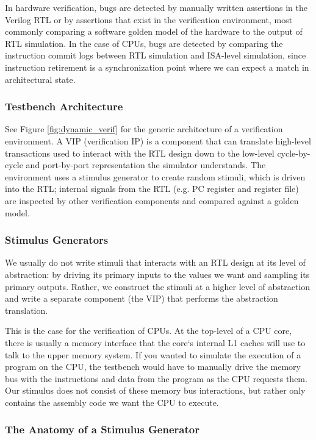\documentclass[sigconf,noacm]{acmart}
\begin{document}
In hardware verification, bugs are detected by manually written assertions in the Verilog RTL or by assertions that exist in the verification environment, most commonly comparing a software golden model of the hardware to the output of RTL simulation.
In the case of CPUs, bugs are detected by comparing the instruction commit logs between RTL simulation and ISA-level simulation, since instruction retirement is a synchronization point where we can expect a match in architectural state.

\subsubsection{Testbench Architecture}

See Figure \ref{fig:dynamic_verif} for the generic architecture of a verification environment.
A VIP (verification IP) is a component that can translate high-level transactions used to interact with the RTL design down to the low-level cycle-by-cycle and port-by-port representation the simulator understands.
The environment uses a stimulus generator to create random stimuli, which is driven into the RTL; internal signals from the RTL (e.g. PC register and register file) are inspected by other verification components and compared against a golden model.

\subsubsection{Stimulus Generators}

We usually do not write stimuli that interacts with an RTL design at its level of abstraction: by driving its primary inputs to the values we want and sampling its primary outputs.
Rather, we construct the stimuli at a higher level of abstraction and write a separate component (the VIP) that performs the abstraction translation.

This is the case for the verification of CPUs.
At the top-level of a CPU core, there is usually a memory interface that the core`s internal L1 caches will use to talk to the upper memory system.
If you wanted to simulate the execution of a program on the CPU, the testbench would have to manually drive the memory bus with the instructions and data from the program as the CPU requests them.
Our stimulus does not consist of these memory bus interactions, but rather only contains the assembly code we want the CPU to execute.

\subsubsection{The Anatomy of a Stimulus Generator}
\end{document}
